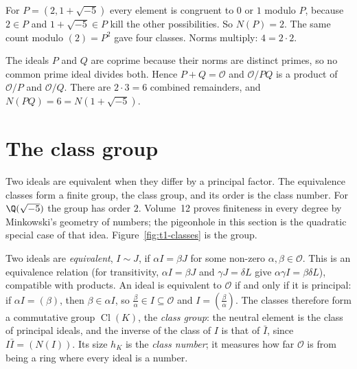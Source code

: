 \begin{examplex}
For $P=(2,1+\sqrt{-5})$ every element is congruent to $0$ or $1$ modulo $P$, because $2\in P$ and $1+\sqrt{-5}\in P$ kill the other possibilities. So $N(P)=2$. The same count modulo $(2)=P^2$ gave four classes. Norms multiply: $4=2\cdot 2$.
\end{examplex}

\begin{examplex}
The ideals $P$ and $Q$ are coprime because their norms are distinct primes, so no common prime ideal divides both. Hence $P+Q=\mathcal O$ and $\mathcal O/PQ$ is a product of $\mathcal O/P$ and $\mathcal O/Q$. There are $2\cdot 3=6$ combined remainders, and $N(PQ)=6=N(1+\sqrt{-5})$.
\end{examplex}

\section{The class group}

Two ideals are equivalent when they differ by a principal factor. The equivalence classes form a finite group, the class group, and its order is the class number. For $\Q(\sqrt{-5})$ the group has order $2$. Volume~12 proves finiteness in every degree by Minkowski's geometry of numbers; the pigeonhole in this section is the quadratic special case of that idea. Figure~\ref{fig:t1-classes} is the group.

Two ideals are \emph{equivalent}, $I\sim J$, if $\alpha I=\beta J$ for some non-zero $\alpha,\beta\in\mathcal O$. This is an equivalence relation (for transitivity, $\alpha I=\beta J$ and $\gamma J=\delta L$ give $\alpha\gamma I=\beta\delta L$), compatible with products. An ideal is equivalent to $\mathcal O$ if and only if it is principal: if $\alpha I=(\beta)$, then $\beta\in\alpha I$, so $\frac\beta\alpha\in I\subseteq\mathcal O$ and $I=\left(\frac\beta\alpha\right)$. The classes therefore form a commutative group $\operatorname{Cl}(K)$, the \emph{class group}: the neutral element is the class of principal ideals, and the inverse of the class of $I$ is that of $\bar I$, since $I\bar I=(N(I))$. Its size $h_K$ is the \emph{class number}; it measures how far $\mathcal O$ is from being a ring where every ideal is a number.

